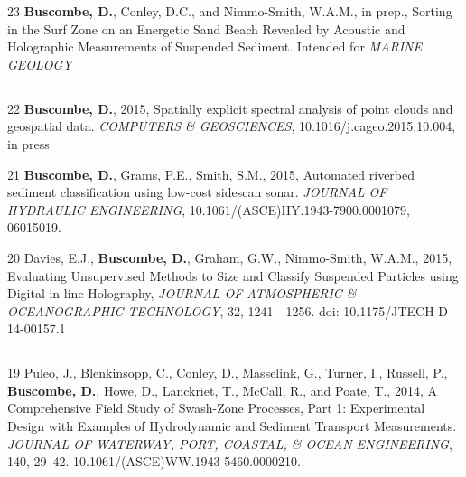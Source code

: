 \documentclass[margin,line]{resume}
\begin{document}
\begin{resume}
\begin{footnotesize}
\begin{list1}
	\item[23] {\bf 	Buscombe, D.}, Conley, D.C., and Nimmo-Smith, W.A.M., in prep., Sorting in the Surf Zone on an Energetic Sand Beach Revealed by Acoustic and Holographic Measurements of Suspended Sediment. Intended for {\sl MARINE GEOLOGY}

	\end{list1}
	
	\subsection{}
	\begin{list1}

	\item[22] {\bf 	Buscombe, D.}, 2015, Spatially explicit spectral analysis of point clouds and geospatial data. {\sl COMPUTERS \& GEOSCIENCES}, 10.1016/j.cageo.2015.10.004, in press\\
		
	\item[21] {\bf Buscombe, D.}, Grams, P.E., Smith, S.M., 2015, Automated riverbed sediment classification using low-cost sidescan sonar. {\sl JOURNAL OF HYDRAULIC ENGINEERING}, 10.1061/(ASCE)HY.1943-7900.0001079, 06015019.\\
	
	\item[20] Davies, E.J., {\bf Buscombe, D.}, Graham, G.W., Nimmo-Smith, W.A.M., 2015, Evaluating Unsupervised Methods to Size and Classify Suspended Particles using Digital in-line Holography, {\sl JOURNAL OF ATMOSPHERIC \& OCEANOGRAPHIC TECHNOLOGY}, 32, 1241 - 1256. doi: 10.1175/JTECH-D-14-00157.1 
	
	\end{list1}
	
	\subsection{}
	\begin{list1}
        \item[19] Puleo, J., Blenkinsopp, C., Conley, D., Masselink, G., Turner, I., Russell, P., {\bf Buscombe, D.}, Howe, D., Lanckriet, T., McCall, R., and Poate, T., 2014, A Comprehensive Field Study of Swash-Zone Processes, Part 1: Experimental Design with Examples of Hydrodynamic and Sediment Transport Measurements. {\sl JOURNAL OF WATERWAY, PORT, COASTAL, \& OCEAN ENGINEERING}, 140, 29–42. 10.1061/(ASCE)WW.1943-5460.0000210.\\


\end{list1}
\end{footnotesize}
\end{resume}
\end{document}
